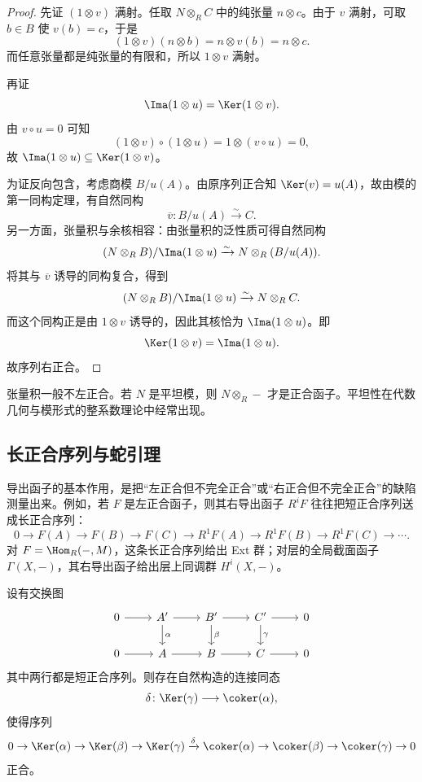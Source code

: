 \begin{proof}
先证 $(1\otimes v)$ 满射。任取 $N\otimes_R C$ 中的纯张量 $n\otimes c$。由于 $v$ 满射，可取 $b\in B$ 使 $v(b)=c$，于是
\[
  (1\otimes v)(n\otimes b)=n\otimes v(b)=n\otimes c.
\]
而任意张量都是纯张量的有限和，所以 $1\otimes v$ 满射。

再证
\[
  \Ima(1\otimes u)=\Ker(1\otimes v).
\]
由 $v\circ u=0$ 可知
\[
  (1\otimes v)\circ (1\otimes u)=1\otimes (v\circ u)=0,
\]
故 $\Ima(1\otimes u)\subseteq \Ker(1\otimes v)$。

为证反向包含，考虑商模 $B/u(A)$。由原序列正合知 $\Ker(v)=u(A)$，故由模的第一同构定理，有自然同构
\[
  \overline v\colon B/u(A)\xrightarrow{\sim} C.
\]
另一方面，张量积与余核相容：由张量积的泛性质可得自然同构
\[
  (N\otimes_R B)/\Ima(1\otimes u)\xrightarrow{\sim} N\otimes_R (B/u(A)).
\]
将其与 $\overline v$ 诱导的同构复合，得到
\[
  (N\otimes_R B)/\Ima(1\otimes u)\xrightarrow{\sim} N\otimes_R C.
\]
而这个同构正是由 $1\otimes v$ 诱导的，因此其核恰为 $\Ima(1\otimes u)$。即
\[
  \Ker(1\otimes v)=\Ima(1\otimes u).
\]
故序列右正合。
\end{proof}

\begin{remark}
张量积一般不左正合。若 $N$ 是平坦模，则 $N\otimes_R -$ 才是正合函子。平坦性在代数几何与模形式的整系数理论中经常出现。
\end{remark}

\subsection{长正合序列与蛇引理}

导出函子的基本作用，是把“左正合但不完全正合”或“右正合但不完全正合”的缺陷测量出来。例如，若 $F$ 是左正合函子，则其右导出函子 $R^iF$ 往往把短正合序列送成长正合序列：
\[
  0\to F(A)\to F(B)\to F(C)\to R^1F(A)\to R^1F(B)\to R^1F(C)\to \cdots.
\]
对 $F=\Hom_R(-,M)$，这条长正合序列给出 Ext 群；对层的全局截面函子 $\Gamma(X,-)$，其右导出函子给出层上同调群 $H^i(X,-)$。

\begin{theorem}[蛇引理]
设有交换图
\[
\begin{tikzcd}
0 \arrow[r] & A' \arrow[r] \arrow[d,"\alpha"] & B' \arrow[r] \arrow[d,"\beta"] & C' \arrow[r] \arrow[d,"\gamma"] & 0 \\
0 \arrow[r] & A \arrow[r] & B \arrow[r] & C \arrow[r] & 0
\end{tikzcd}
\]
其中两行都是短正合序列。则存在自然构造的连接同态
\[
  \delta\colon \Ker(\gamma)\longrightarrow \coker(\alpha),
\]
使得序列
\[
  0\to \Ker(\alpha)\to \Ker(\beta)\to \Ker(\gamma)
  \xrightarrow{\delta}
  \coker(\alpha)\to \coker(\beta)\to \coker(\gamma)\to 0
\]
正合。
\end{theorem}

